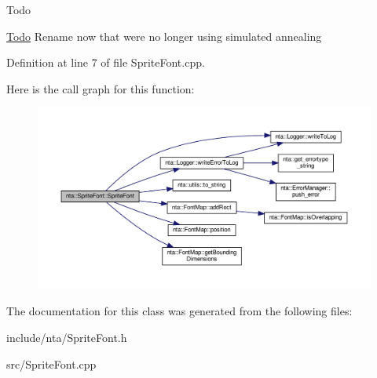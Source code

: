 \begin{DoxyRefDesc}{Todo}
\item[\hyperlink{todo__todo000028}{Todo}]Rename now that we\textquotesingle{}re no longer using simulated annealing \end{DoxyRefDesc}


Definition at line 7 of file Sprite\+Font.\+cpp.

Here is the call graph for this function\+:
\nopagebreak
\begin{figure}[H]
\begin{center}
\leavevmode
\includegraphics[width=350pt]{d6/d57/classnta_1_1SpriteFont_a9dc96f31efd0830dcb476ea87534e358_cgraph}
\end{center}
\end{figure}


The documentation for this class was generated from the following files\+:\begin{DoxyCompactItemize}
\item 
include/nta/Sprite\+Font.\+h\item 
src/Sprite\+Font.\+cpp\end{DoxyCompactItemize}
